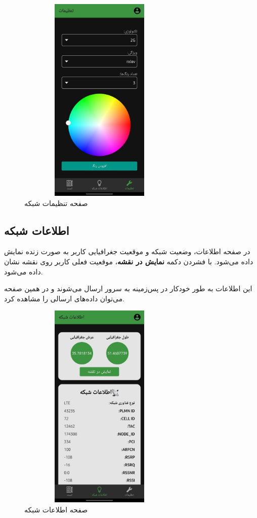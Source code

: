 \documentclass{report}
\begin{document}
\begin{figure}[ht]
	\centering
	\includegraphics[width=0.7\textwidth,height=10cm,keepaspectratio]{Pic/setting}
	\caption{صفحه تنظیمات شبکه}
	\label{fig:setting}
\end{figure}

\subsection{اطلاعات شبکه}

در صفحه اطلاعات، وضعیت شبکه و موقعیت جغرافیایی کاربر به صورت زنده نمایش داده می‌شود.  
با فشردن دکمه \textbf{نمایش در نقشه}، موقعیت فعلی کاربر روی نقشه نشان داده می‌شود.

این اطلاعات به طور خودکار در پس‌زمینه به سرور ارسال می‌شوند و در همین صفحه می‌توان داده‌های ارسالی را مشاهده کرد.

\begin{figure}[ht]
	\centering
		\includegraphics[width=0.7\textwidth,height=10cm,keepaspectratio]{Pic/info}
	\caption{صفحه اطلاعات شبکه}
	\label{fig:info}
\end{figure}
\end{document}
